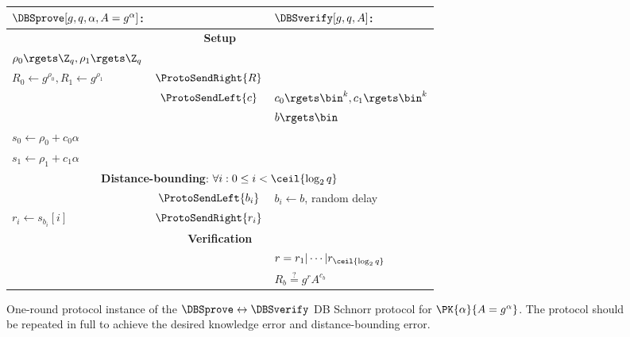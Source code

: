 \begin{figure*}
  \centering
  \begin{tabular}{lcl}
    \(\DBSprove[g, q, \alpha, A = g^\alpha]\):
    & &
    \(\DBSverify[g, q, A]\): \\
    \toprule

    \multicolumn{3}{c}{\textbf{Setup}} \\

    \(\rho_0\rgets \Z_q, \rho_1\rgets \Z_q\)
    &
    & \\

    \(R_0\gets g^{\rho_0}, R_1\gets g^{\rho_1}\)
    & \(\ProtoSendRight{R}\)
    & \\

    & \(\ProtoSendLeft{c}\)
    & \(c_0\rgets \bin^k, c_1\rgets \bin^k\) \\

    &
    & \(b\rgets \bin\) \\

    \(s_0\gets \rho_0 + c_0\alpha\)
    &
    & \\

    \(s_1\gets \rho_1 + c_1\alpha\)
    &
    & \\

    \midrule
    \multicolumn{3}{c}{\textbf{Distance-bounding}: \(\forall i: 0\leq i < 
        \ceil{\log_2 q}\)} \\


    & \(\ProtoSendLeft{b_i}\)
    & \(b_i\gets b\), random delay \\

    \(r_i\gets s_{b_i}[i]\)
    & \(\ProtoSendRight{r_i}\)
    & \\

    \midrule
    \multicolumn{3}{c}{\textbf{Verification}} \\

    &
    & \(r = r_1|\dotsb|r_{\ceil{\log_2 q}}\) \\

    &
    & \(R_b \stackrel{?}{=} g^r A^{c_b}\) \\
    
    \bottomrule
  \end{tabular}
  \caption{%
    One-round protocol instance of the \(\DBSprove\leftrightarrow \DBSverify\) 
    \ac{DB} Schnorr protocol for \(\PK{\alpha}{A = g^\alpha}\).
    The protocol should be repeated in full to achieve the desired knowledge 
    error and distance-bounding error.
  }%
  \label{SchnorrFigure}
\end{figure*}

